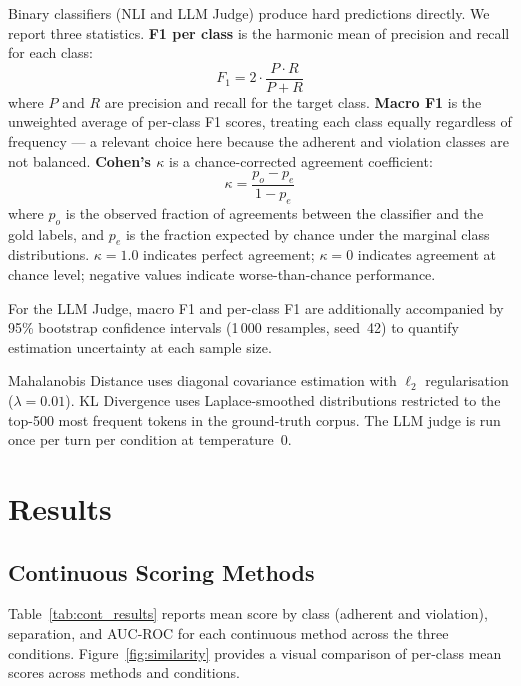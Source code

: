 \documentclass[11pt,a4paper]{article}
\begin{document}
Binary classifiers (NLI and LLM Judge) produce hard predictions directly.
We report three statistics.
\textbf{F1 per class} is the harmonic mean of precision and recall for each
class:
\begin{equation}
  F_1 = 2 \cdot \frac{P \cdot R}{P + R}
\end{equation}
where $P$ and $R$ are precision and recall for the target class.
\textbf{Macro F1} is the unweighted average of per-class F1 scores,
treating each class equally regardless of frequency --- a relevant choice
here because the adherent and violation classes are not balanced.
\textbf{Cohen's $\kappa$} \citep{cohen1960kappa} is a chance-corrected
agreement coefficient:
\begin{equation}
  \kappa = \frac{p_o - p_e}{1 - p_e}
\end{equation}
where $p_o$ is the observed fraction of agreements between the classifier
and the gold labels, and $p_e$ is the fraction expected by chance under the
marginal class distributions. $\kappa = 1.0$ indicates perfect agreement;
$\kappa = 0$ indicates agreement at chance level; negative values indicate
worse-than-chance performance.

For the LLM Judge, macro F1 and per-class F1 are additionally accompanied by
95\% bootstrap confidence intervals (1\,000 resamples, seed~42) to quantify
estimation uncertainty at each sample size.

Mahalanobis Distance uses diagonal covariance estimation with $\ell_2$
regularisation ($\lambda = 0.01$). KL Divergence uses Laplace-smoothed
distributions restricted to the top-500 most frequent tokens in the
ground-truth corpus. The LLM judge is run once per turn per condition at
temperature~0.

\newpage

\section{Results}
\label{sec:results}

\subsection{Continuous Scoring Methods}

Table~\ref{tab:cont_results} reports mean score by class (adherent and
violation), separation, and AUC-ROC for each continuous method across the
three conditions. Figure~\ref{fig:similarity} provides a visual comparison
of per-class mean scores across methods and conditions.
\end{document}
